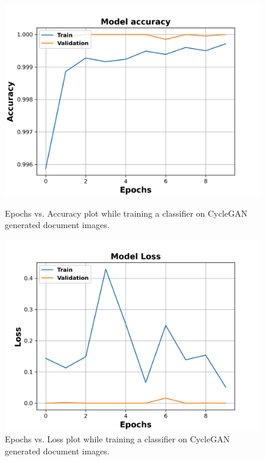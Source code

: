 \begin{figure}[H]
  \centering
  \begin{minipage}[b]{0.45\textwidth}
    \includegraphics[width=\textwidth]{images/Evaluation/CycleGAN_Generated_Data_Classifier_2021-06-02_21-55-39_Accuracy.png}
    \caption[Epochs vs. Accuracy plot while training a classifier on \ac{CycleGAN} generated document images.]{Epochs vs. Accuracy plot while training a classifier  on \ac{CycleGAN} generated document images.}
    \label{fig:CycleGANClassifierAcc}
  \end{minipage}
  \hfill
  \begin{minipage}[b]{0.45\textwidth}
    \includegraphics[width=\textwidth]{images/Evaluation/CycleGAN_Generated_Data_Classifier_2021-06-02_21-55-39_Loss.png}
    \caption[Epochs vs. Loss plot while training a classifier on \ac{CycleGAN} generated document images.]{Epochs vs. Loss plot while training a classifier on \ac{CycleGAN} generated document images.}
    \label{fig:CycleGANClassifierLoss}
  \end{minipage}
\end{figure}


